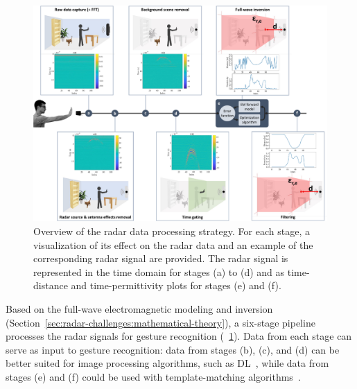 \begin{figure}[t]
\centering
\includegraphics[width=\linewidth,trim={0 0 0.3cm 0},clip]{Figures/RadarChallenges/Pipeline/pipeline-detailed.pdf}
\caption{Overview of the radar data processing strategy. For each stage, a visualization of its effect on the radar data and an example of the corresponding radar signal are provided. The radar signal is represented in the time domain for stages (a) to (d) and as time-distance and time-permittivity plots for stages (e) and (f).}
\label{fig:radar-challenges:pipeline}
\vspace{-12pt}
\end{figure}

Based on the full-wave electromagnetic modeling and inversion (Section~\ref{sec:radar-challenges:mathematical-theory}), a six-stage pipeline processes the radar signals for gesture recognition (\fig~\ref{fig:radar-challenges:pipeline}). Data from each stage can serve as input to gesture recognition: data from stages (b), (c), and (d) can be better suited for image processing algorithms, such as DL~\cite{Skaria:2019}, while data from stages (e) and (f) could be used with template-matching algorithms~\cite{Ousmer:2020}.

